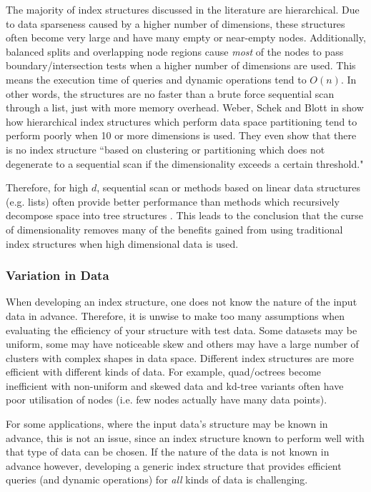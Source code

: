 The majority of index structures discussed in the literature are hierarchical. Due to data sparseness caused by a higher number of dimensions, these structures often become very large and have many empty or near-empty nodes. Additionally, balanced splits and overlapping node regions cause \textit{most} of the nodes to pass boundary/intersection tests when a higher number of dimensions are used. This means the execution time of queries and dynamic operations tend to $O(n)$. In other words, the structures are no faster than a brute force sequential scan through a list, just with more memory overhead. Weber, Schek and Blott in \cite{va-file} show how hierarchical index structures which perform data space partitioning tend to perform poorly when 10 or more dimensions is used. They even show that there is no index structure ``based on clustering or partitioning which does not degenerate to a sequential scan if the dimensionality exceeds a certain threshold."

Therefore, for high $d$, sequential scan or methods based on linear data structures (e.g. lists) often provide better performance than methods which recursively decompose space into tree structures \cite{md-structures-samet}. This leads to the conclusion that the curse of dimensionality removes many of the benefits gained from using traditional index structures when high dimensional data is used.

\subsubsection{Variation in Data}

When developing an index structure, one does not know the nature of the input data in advance. Therefore, it is unwise to make too many assumptions when evaluating the efficiency of your structure with test data. Some datasets may be uniform, some may have noticeable skew and others may have a large number of clusters with complex shapes in data space. Different index structures are more efficient with different kinds of data. For example, quad/octrees become inefficient with non-uniform and skewed data and kd-tree variants often have poor utilisation of nodes \cite{bkd-tree} (i.e. few nodes actually have many data points).

For some applications, where the input data's structure may be known in advance, this is not an issue, since an index structure known to perform well with that type of data can be chosen. If the nature of the data is not known in advance however, developing a generic index structure that provides efficient queries (and dynamic operations) for \textit{all} kinds of data is challenging.

